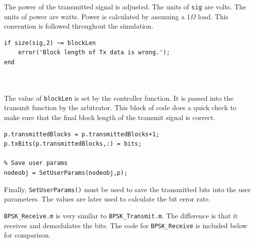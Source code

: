 The power of the transmitted signal is adjusted.  The units of
\verb+sig+ are volts.  The units of power are watts.  Power is
calculated by assuming a 1$\Omega$ load.  This convention is
followed throughout the simulation.

\begin{lstlisting}[name=bpskTx]
% Check blockLen
if size(sig,2) ~= blockLen
    error('Block length of Tx data is wrong.');
end



\end{lstlisting}

The value of \verb+blockLen+ is set by the controller function.  It
is passed into the transmit function by the arbitrator.  This block
of code does a quick check to make sure that the final block length
of the transmit signal is correct.

\begin{lstlisting}[name=bpskTx]
% Save txbits
p.transmittedBlocks = p.transmittedBlocks+1;
p.txBits(p.transmittedBlocks,:) = bits;

% Save user params
nodeobj = SetUserParams(nodeobj,p);
\end{lstlisting}

Finally, \verb+SetUserParams()+ must be used to save the transmitted
bits into the user parameters.  The values are later used to
calculate the bit error rate.

\verb+BPSK_Receive.m+ is very similar to \verb+BPSK_Transmit.m+. The
difference is that it receives and demodulates the bits.  The code
for \verb+BPSK_Receive+ is included below for comparison.

